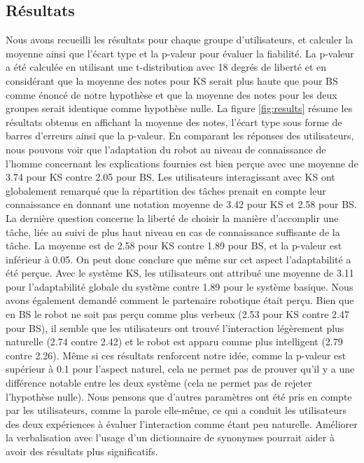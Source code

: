 \documentclass[a4paper,11pt,twoside]{StyleThese}
\begin{document}
\subsection{Résultats}

Nous avons recueilli les résultats pour chaque groupe d'utilisateurs, et calculer la moyenne ainsi que l'écart type et la p-valeur pour évaluer la fiabilité. La p-valeur a été calculée en utilisant une t-distribution avec 18 degrés de liberté et en considérant que la moyenne des notes pour KS serait plus haute que pour BS comme énoncé de notre hypothèse et que la moyenne des notes pour les deux groupes serait identique comme hypothèse nulle.
La figure \ref{fig:results} résume les résultats obtenus en affichant la moyenne des notes, l'écart type sous forme de barres d'erreurs ainsi que la p-valeur. En comparant les réponses des utilisateurs, nous pouvons voir que l'adaptation du robot au niveau de connaissance de l'homme concernant les explications fournies est bien perçue avec une moyenne de 3.74 pour KS contre 2.05 pour BS. Les utilisateurs interagissant avec KS ont globalement remarqué que la répartition des tâches prenait en compte leur connaissance en donnant une notation moyenne de 3.42 pour KS et 2.58 pour BS. La dernière question concerne la liberté de choisir la manière d'accomplir une tâche, liée au suivi de plus haut niveau en cas de connaissance suffisante de la tâche. La moyenne est de 2.58 pour KS contre 1.89 pour BS, et la p-valeur est inférieur à 0.05. On peut donc conclure que même sur cet aspect l'adaptabilité a été perçue.
Avec le système KS, les utilisateurs ont attribué une moyenne de 3.11 pour l'adaptabilité globale du système contre 1.89 pour le système basique.
Nous avons également demandé comment le partenaire robotique était perçu. Bien que en BS le robot ne soit pas perçu comme plus verbeux (2.53 pour KS contre 2.47 pour BS), il semble que les utilisateurs ont trouvé l'interaction légèrement plus naturelle (2.74 contre 2.42) et le robot est apparu comme plus intelligent (2.79 contre 2.26). Même si ces résultats renforcent notre idée, comme la p-valeur est supérieur à 0.1 pour l'aspect naturel, cela ne permet pas de prouver qu'il y a une différence notable entre les deux système (cela ne permet pas de rejeter l'hypothèse nulle).
Nous pensons que d'autres paramètres ont été pris en compte par les utilisateurs, comme la parole elle-même, ce qui a conduit les utilisateurs des deux expériences à évaluer l'interaction comme étant peu naturelle. Améliorer la verbalisation avec l'usage d'un dictionnaire de synonymes pourrait aider à avoir des résultats plus significatifs.
\end{document}

